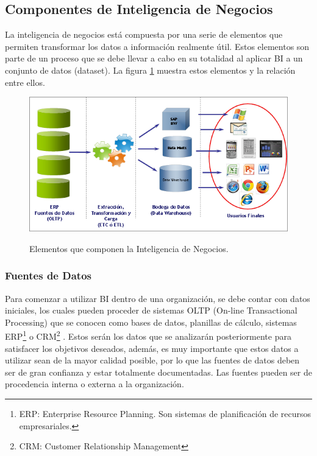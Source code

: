 \documentclass[letter,12pt,oneside]{report}
\begin{document}
\subsection{Componentes de Inteligencia de Negocios}
La inteligencia de negocios está compuesta por una serie de elementos que permiten transformar los datos a información realmente útil. Estos elementos son parte de un proceso que se debe llevar a cabo en su totalidad al aplicar BI a un conjunto de datos (dataset). La figura \ref{bi_comp} muestra estos elementos y la relación entre ellos.

\begin{figure}[h]
\begin{center}
\includegraphics[scale=0.8]{images/bi_components.png}
\caption{Elementos que componen la Inteligencia de Negocios.}
\label{bi_comp}
\end{center}
\end{figure}

\subsubsection{Fuentes de Datos}
Para comenzar a utilizar BI dentro de una organización, se debe contar con datos iniciales, los cuales pueden proceder de sistemas OLTP (On-line Transactional Processing) que se conocen como bases de datos, planillas de cálculo, sistemas ERP\footnote{ERP: Enterprise Resource Planning. Son sistemas de planificación de recursos empresariales.} o CRM\footnote{CRM: Customer Relationship Management} \cite{P3}. Estos serán los datos que se analizarán posteriormente para satisfacer los objetivos deseados, además, es muy importante que estos datos a utilizar sean de la mayor calidad posible, por lo que las fuentes de datos deben ser de gran confianza y estar totalmente documentadas. Las fuentes pueden ser de procedencia interna o externa a la organización.
\end{document}
